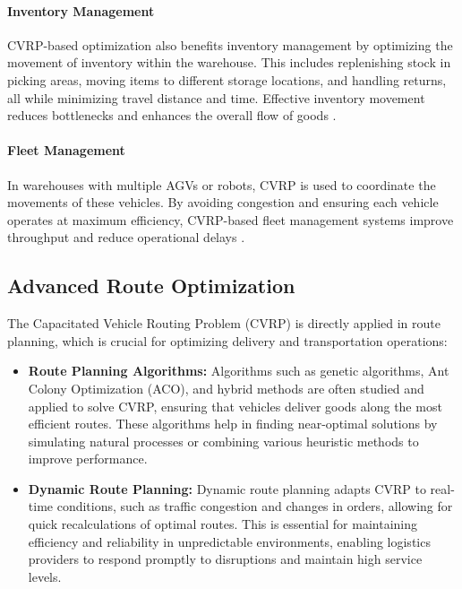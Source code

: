 \documentclass[
]{article}
\begin{document}
    \paragraph{Inventory Management}
    CVRP-based optimization also benefits inventory management by optimizing the movement of inventory within the warehouse. This includes replenishing stock in picking areas, moving items to different storage locations, and handling returns, all while minimizing travel distance and time. Effective inventory movement reduces bottlenecks and enhances the overall flow of goods \cite{inventory_management}.

    \paragraph{Fleet Management}
    In warehouses with multiple AGVs or robots, CVRP is used to coordinate the movements of these vehicles. By avoiding congestion and ensuring each vehicle operates at maximum efficiency, CVRP-based fleet management systems improve throughput and reduce operational delays \cite{fleet_management}.

    \subsection*{Advanced Route Optimization}

    The Capacitated Vehicle Routing Problem (CVRP) is directly applied in route planning, which is crucial for optimizing delivery and transportation operations:

    \begin{itemize}
        \item \textbf{Route Planning Algorithms:} Algorithms such as genetic algorithms, Ant Colony Optimization (ACO), and hybrid methods are often studied and applied to solve CVRP, ensuring that vehicles deliver goods along the most efficient routes. These algorithms help in finding near-optimal solutions by simulating natural processes or combining various heuristic methods to improve performance.
        \item \textbf{Dynamic Route Planning:} Dynamic route planning adapts CVRP to real-time conditions, such as traffic congestion and changes in orders, allowing for quick recalculations of optimal routes. This is essential for maintaining efficiency and reliability in unpredictable environments, enabling logistics providers to respond promptly to disruptions and maintain high service levels.
    \end{itemize}
\end{document}
